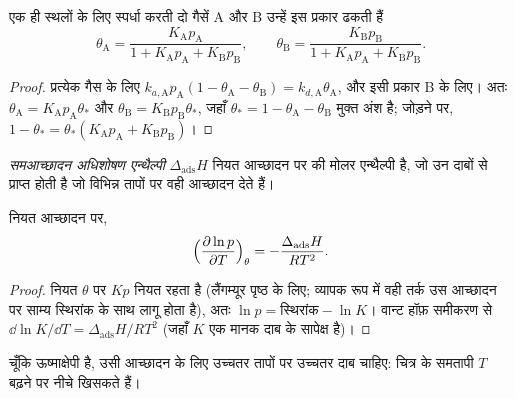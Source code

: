 \begin{proposition}[स्पर्धी अधिशोषण]\label{prop:b3:surfaces-catalysis:competitive}
एक ही स्थलों के लिए स्पर्धा करती दो गैसें A और B उन्हें इस प्रकार ढकती हैं
\[
  \theta_{\mathrm A} = \frac{K_{\mathrm A}p_{\mathrm A}}{1 + K_{\mathrm A}p_{\mathrm A} + K_{\mathrm B}p_{\mathrm B}}, \qquad
  \theta_{\mathrm B} = \frac{K_{\mathrm B}p_{\mathrm B}}{1 + K_{\mathrm A}p_{\mathrm A} + K_{\mathrm B}p_{\mathrm B}} .
\]
\end{proposition}

\begin{proof}
प्रत्येक गैस के लिए $k_{a,\mathrm A}p_{\mathrm A}(1 - \theta_{\mathrm A} - \theta_{\mathrm B}) = k_{d,\mathrm A}\theta_{\mathrm A}$, और इसी प्रकार B के लिए। अतः
$\theta_{\mathrm A} = K_{\mathrm A}p_{\mathrm A}\theta_\ast$ और $\theta_{\mathrm B} = K_{\mathrm B}p_{\mathrm B}\theta_\ast$, जहाँ $\theta_\ast = 1 - \theta_{\mathrm A} - \theta_{\mathrm B}$ मुक्त अंश है; जोड़ने पर,
$1 - \theta_\ast = \theta_\ast(K_{\mathrm A}p_{\mathrm A} + K_{\mathrm B}p_{\mathrm B})$।
\end{proof}

\begin{definition}[समआच्छादन अधिशोषण एन्थैल्पी]\label{def:b3:surfaces-catalysis:isosteric}
\emph{समआच्छादन अधिशोषण एन्थैल्पी}
$\Delta_{\mathrm{ads}}H$ नियत आच्छादन पर  की मोलर एन्थैल्पी है,
जो उन दाबों से प्राप्त होती है जो विभिन्न तापों पर वही आच्छादन
देते हैं।
\end{definition}

\begin{proposition}[समआच्छादन एन्थैल्पी]\label{prop:b3:surfaces-catalysis:isosteric}
नियत आच्छादन पर,
\[
  \Bigl(\frac{\partial\ln p}{\partial T}\Bigr)_\theta = -\frac{\Delta_{\mathrm{ads}}H}{RT^2} .
\]
\end{proposition}

\begin{proof}
नियत $\theta$ पर $Kp$ नियत रहता है (लैंगम्यूर पृष्ठ के लिए; व्यापक रूप में वही
तर्क उस आच्छादन पर साम्य स्थिरांक के साथ लागू होता है), अतः $\ln p =
\text{स्थिरांक} - \ln K$। वान्ट हॉफ़ समीकरण से $\dd\ln K/\dd T = \Delta_{\mathrm{ads}}H/RT^2$ (जहाँ $K$
एक मानक दाब के सापेक्ष है)।
\end{proof}

चूँकि  ऊष्माक्षेपी है, उसी आच्छादन के लिए उच्चतर तापों पर उच्चतर दाब
चाहिए: चित्र के समतापी $T$ बढ़ने पर नीचे खिसकते हैं।

